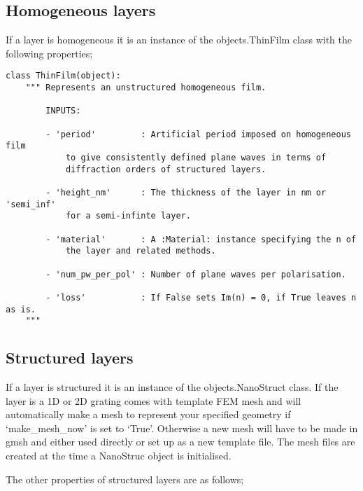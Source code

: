 \documentclass[11pt,a4paper,twoside]{report}
\begin{document}
\subsection{Homogeneous layers}
If a layer is homogeneous it is an instance of the objects.ThinFilm class with the following properties;


\begin{lstlisting}
class ThinFilm(object):
    """ Represents an unstructured homogeneous film.

        INPUTS:

        - 'period'         : Artificial period imposed on homogeneous film 
            to give consistently defined plane waves in terms of 
            diffraction orders of structured layers.

        - 'height_nm'      : The thickness of the layer in nm or 'semi_inf'
            for a semi-infinte layer.

        - 'material'       : A :Material: instance specifying the n of 
            the layer and related methods.

        - 'num_pw_per_pol' : Number of plane waves per polarisation.

        - 'loss'           : If False sets Im(n) = 0, if True leaves n as is.
    """
\end{lstlisting}



\subsection{Structured layers}
If a layer is structured it is an instance of the objects.NanoStruct class. If the layer is a 1D or 2D grating \CodeName comes with template FEM mesh and will automatically make a mesh to represent your specified geometry if `make\_mesh\_now' is set to `True'. Otherwise a new mesh will have to be made in gmsh and either used directly or set up as a new template file. The mesh files are created at the time a NanoStruc object is initialised.

The other properties of structured layers are as follows;
\end{document}
